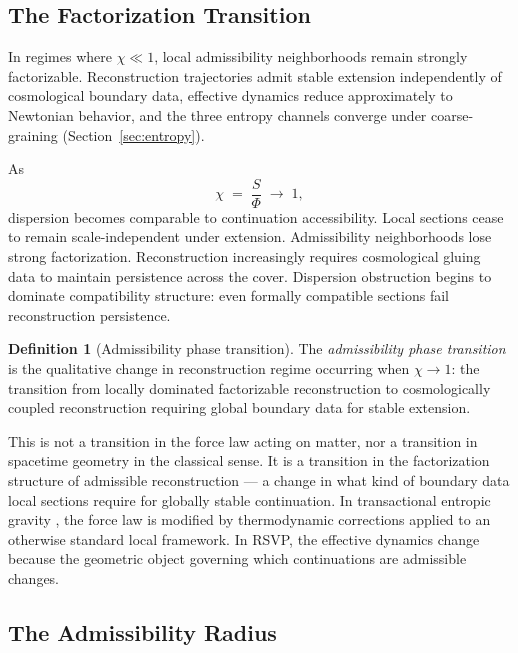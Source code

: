 \documentclass[11pt, a4paper]{article}
\theoremstyle{plain}
\theoremstyle{definition}
\newtheorem{definition}[theorem]{Definition}
\theoremstyle{remark}
\begin{document}
\subsection{The Factorization Transition}

In regimes where $\chi \ll 1$, local admissibility neighborhoods remain strongly
factorizable. Reconstruction trajectories admit stable extension independently of
cosmological boundary data, effective dynamics reduce approximately to Newtonian
behavior, and the three entropy channels converge under coarse-graining
(Section~\ref{sec:entropy}).

As
\begin{equation}
  \chi \;=\; \frac{S}{\Phi} \;\longrightarrow\; 1,
\end{equation}
dispersion becomes comparable to continuation accessibility. Local sections cease to
remain scale-independent under extension. Admissibility neighborhoods lose strong
factorization. Reconstruction increasingly requires cosmological gluing data to
maintain persistence across the cover. Dispersion obstruction begins to dominate
compatibility structure: even formally compatible sections fail reconstruction
persistence.

\begin{definition}[Admissibility phase transition]
\label{def:phase-trans}
The \emph{admissibility phase transition} is the qualitative change in reconstruction
regime occurring when $\chi \to 1$: the transition from locally dominated
factorizable reconstruction to cosmologically coupled reconstruction requiring global
boundary data for stable extension.
\end{definition}

This is not a transition in the force law acting on matter, nor a transition in
spacetime geometry in the classical sense. It is a transition in the factorization
structure of admissible reconstruction --- a change in what kind of boundary data
local sections require for globally stable continuation. In transactional entropic
gravity \cite{kastner2024}, the force law is modified by thermodynamic corrections
applied to an otherwise standard local framework. In RSVP, the effective dynamics
change because the geometric object governing which continuations are admissible
changes.

\subsection{The Admissibility Radius}
\end{document}
